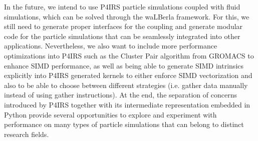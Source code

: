 \documentclass[preprint,12pt]{elsarticle}
\begin{document}
In the future, we intend to use P4IRS particle simulations coupled with fluid simulations, which can be solved through the waLBerla framework.
For this, we still need to generate proper interfaces for the coupling and generate modular code for the particle simulations that can be seamlessly integrated into other applications.
Nevertheless, we also want to include more performance optimizations into P4IRS such as the Cluster Pair algorithm from GROMACS to enhance SIMD performance, as well as being able to generate SIMD intrinsics explicitly into P4IRS generated kernels to either enforce SIMD vectorization and also to be able to choose between different strategies (i.e. gather data manually instead of using gather instructions).
At the end, the separation of concerns introduced by P4IRS together with its intermediate representation embedded in Python provide several opportunities to explore and experiment with performance on many types of particle simulations that can belong to distinct research fields.





 






\end{document}
